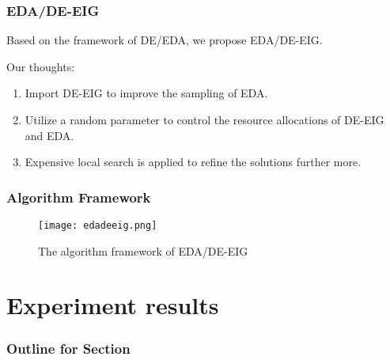 \documentclass[xcolor=dvipsnames]{beamer}
\begin{document}
    \begin{frame}
    \frametitle{EDA/DE-EIG}
    Based on the framework of DE/EDA, we propose EDA/DE-EIG.

    Our thoughts:
    \begin{enumerate}
    \item Import DE-EIG to improve the sampling of EDA.
    \item Utilize a random parameter to control the resource allocations of DE-EIG and EDA.
    \item Expensive local search is applied to refine the solutions further more.
    \end{enumerate}

    \end{frame}

    \begin{frame}
    \frametitle{Algorithm Framework}
    \begin{figure}[H]
    \graphicspath{{figs/}}
    \texttt{[image: edadeeig.png]}
    \caption{The algorithm framework of EDA/DE-EIG}
    \end{figure}
    \end{frame}



    \section{Experiment results}
    \begin{frame}
      \frametitle{Outline for Section \thesection}
      \tableofcontents[currentsection]
    \end{frame}
\end{document}
